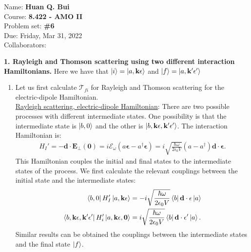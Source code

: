 \documentclass{article}
\theoremstyle{definition}
\newcommand{\f}[2]{\frac{#1}{#2}}
\begin{document}
\begin{framed}
\noindent Name: \textbf{Huan Q. Bui}\\
Course: \textbf{8.422 - AMO II}\\
Problem set: \textbf{\#6}\\
Due: Friday, Mar 31, 2022\\
Collaborators:  
\end{framed}
	



\noindent \textbf{1. Rayleigh and Thomson scattering using two different interaction Hamiltonians.} Here we have that $\ket{i} = \ket{a, \mathbf{k\epsilon}}$ and $\ket{f} = \ket{a, \mathbf{k' \epsilon'}}$

\begin{enumerate}[label=(\alph*)]
\item Let us first calculate $\mathcal{T}_{fi}$ for Rayleigh and Thomson scattering for the electric-dipole Hamiltonian. \\


\noindent \underline{Rayleigh scattering, electric-dipole Hamiltonian}:  There are two possible processes with different intermediate states. One possibility is that the intermediate state is $\ket{b, 0}$ and the other is $\ket{b, \mathbf{k\epsilon, k'\epsilon'}}$. The interaction Hamiltonian is:
\begin{align*}
H_{I}' =  -  \mathbf{d}\cdot \mathbf{E_\perp(0)} =  i \mathcal{E}_{\omega} (a \mathbf{\epsilon} - a^\dagger \mathbf{\epsilon} ) = i \sqrt{\f{ \hbar \omega }{2\epsilon_0 V}}  (a - a^\dagger) \mathbf{d} \cdot  \mathbf{\epsilon}. 
\end{align*}
This Hamiltonian couples the initial and final states to the intermediate states of the process. We first calculate the relevant couplings between the initial state and the intermediate states:
\begin{align*}
\bra{b,0}  H_I' \ket{a, \mathbf{k\epsilon}} 
&= -i \sqrt{\f{\hbar \omega}{ 2\epsilon_0 V }} \bra{b} \mathbf{d}\cdot \mathbf{\epsilon} \ket{a} \\
\bra{b, \mathbf{k\epsilon , k'\epsilon'}} H_i' \ket{a, \mathbf{k\epsilon,0}} 
&= i \sqrt{\f{\hbar \omega}{2\epsilon_0 V}} \bra{b} \mathbf{d} \cdot \mathbf{\epsilon'} \ket{a}. 
\end{align*}
Similar results can be obtained the couplings between the intermediate states and the final state $\ket{f}$. \\


\end{enumerate}
\end{document}
